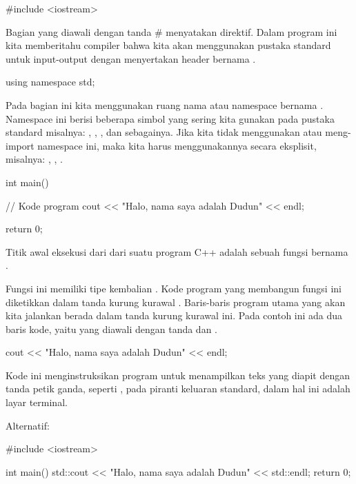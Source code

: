\documentclass[a4paper,11pt,bahasa]{article} %
\begin{document}
\begin{cppcode}
#include <iostream>
\end{cppcode}

Bagian yang diawali dengan tanda \# menyatakan direktif.
Dalam program ini kita memberitahu compiler bahwa kita akan menggunakan
pustaka standard untuk input-output dengan menyertakan header bernama
.

\begin{cppcode}
using namespace std;
\end{cppcode}
Pada bagian ini kita menggunakan ruang nama atau namespace bernama .
Namespace ini berisi beberapa simbol yang sering kita gunakan pada pustaka standard
misalnya:
, , , dan sebagainya.
Jika kita tidak menggunakan atau meng-import namespace ini, maka kita harus menggunakannya
secara eksplisit, misalnya:
, , .


\begin{cppcode}
int main()
{
  // Kode program
  cout << "Halo, nama saya adalah Dudun" << endl;

  return 0;
}
\end{cppcode}

Titik awal eksekusi dari dari suatu program C++ adalah sebuah fungsi
bernama .

Fungsi ini memiliki tipe kembalian
. Kode program yang membangun fungsi ini diketikkan
dalam tanda kurung kurawal \cppinline{ {} }.
Baris-baris program utama yang akan kita jalankan berada dalam tanda kurung kurawal
ini. Pada contoh ini ada dua baris kode, yaitu yang diawali dengan
tanda  dan .

\begin{cppcode}
cout << "Halo, nama saya adalah Dudun" << endl;
\end{cppcode}
Kode ini menginstruksikan program untuk menampilkan teks yang diapit dengan
tanda petik ganda, seperti ,
pada piranti keluaran standard, dalam hal ini adalah layar terminal.




Alternatif:
\begin{cppcode}
#include <iostream>

int main()
{
  std::cout << "Halo, nama saya adalah Dudun" << std::endl;
  return 0;
}
\end{cppcode}
\end{document}
